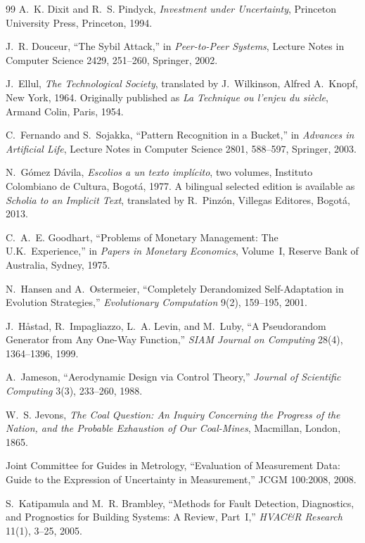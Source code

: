 \documentclass[11pt,openany]{book}
\theoremstyle{plain}
\theoremstyle{definition}
\theoremstyle{remark}
\begin{document}
\begin{thebibliography}{99}
A.~K. Dixit and R.~S. Pindyck,
\emph{Investment under Uncertainty},
Princeton University Press, Princeton, 1994.

J.~R. Douceur,
``The Sybil Attack,''
in \emph{Peer-to-Peer Systems}, Lecture Notes in Computer Science 2429, 251--260, Springer, 2002.

J.~Ellul,
\emph{The Technological Society},
translated by J.~Wilkinson, Alfred A.\ Knopf, New York, 1964.
Originally published as \emph{La Technique ou l'enjeu du si\`ecle}, Armand Colin, Paris, 1954.

C.~Fernando and S.~Sojakka,
``Pattern Recognition in a Bucket,''
in \emph{Advances in Artificial Life}, Lecture Notes in Computer Science 2801, 588--597, Springer, 2003.

N.~G\'omez D\'avila,
\emph{Escolios a un texto impl\'icito},
two volumes, Instituto Colombiano de Cultura, Bogot\'a, 1977.
A bilingual selected edition is available as \emph{Scholia to an Implicit Text}, translated by R.~Pinz\'on, Villegas Editores, Bogot\'a, 2013.

C.~A.~E. Goodhart,
``Problems of Monetary Management: The U.K.\ Experience,''
in \emph{Papers in Monetary Economics}, Volume~I, Reserve Bank of Australia, Sydney, 1975.

N.~Hansen and A.~Ostermeier,
``Completely Derandomized Self-Adaptation in Evolution Strategies,''
\emph{Evolutionary Computation} 9(2), 159--195, 2001.

J.~H\aa stad, R.~Impagliazzo, L.~A. Levin, and M.~Luby,
``A Pseudorandom Generator from Any One-Way Function,''
\emph{SIAM Journal on Computing} 28(4), 1364--1396, 1999.

A.~Jameson,
``Aerodynamic Design via Control Theory,''
\emph{Journal of Scientific Computing} 3(3), 233--260, 1988.

W.~S. Jevons,
\emph{The Coal Question: An Inquiry Concerning the Progress of the Nation, and the Probable Exhaustion of Our Coal-Mines},
Macmillan, London, 1865.

Joint Committee for Guides in Metrology,
``Evaluation of Measurement Data: Guide to the Expression of Uncertainty in Measurement,''
JCGM 100:2008, 2008.

S.~Katipamula and M.~R. Brambley,
``Methods for Fault Detection, Diagnostics, and Prognostics for Building Systems: A Review, Part~I,''
\emph{HVAC\&R Research} 11(1), 3--25, 2005.


\end{thebibliography}
\end{document}
